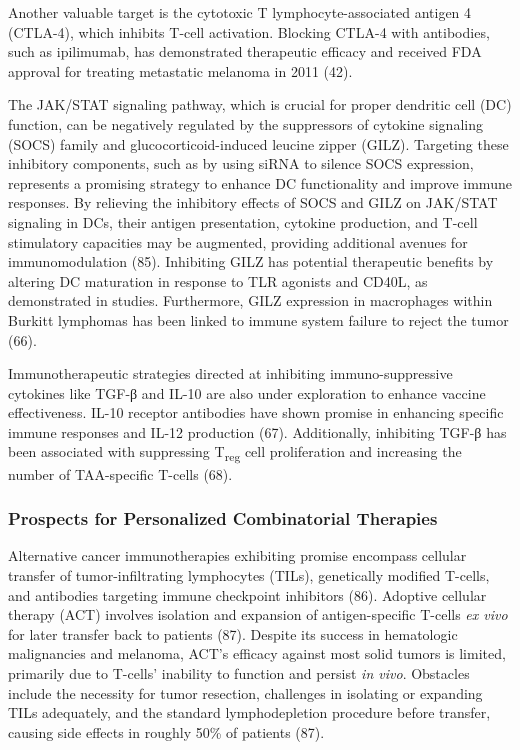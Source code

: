 \documentclass[
]{article}
\begin{document}
Another valuable target is the cytotoxic T lymphocyte-associated antigen
4 (CTLA-4), which inhibits T-cell activation. Blocking CTLA-4 with
antibodies, such as ipilimumab, has demonstrated therapeutic efficacy
and received FDA approval for treating metastatic melanoma in 2011 (42).

The JAK/STAT signaling pathway, which is crucial for proper dendritic
cell (DC) function, can be negatively regulated by the suppressors of
cytokine signaling (SOCS) family and glucocorticoid-induced leucine
zipper (GILZ). Targeting these inhibitory components, such as by using
siRNA to silence SOCS expression, represents a promising strategy to
enhance DC functionality and improve immune responses. By relieving the
inhibitory effects of SOCS and GILZ on JAK/STAT signaling in DCs, their
antigen presentation, cytokine production, and T-cell stimulatory
capacities may be augmented, providing additional avenues for
immunomodulation (85). Inhibiting GILZ has potential therapeutic
benefits by altering DC maturation in response to TLR agonists and
CD40L, as demonstrated in studies. Furthermore, GILZ expression in
macrophages within Burkitt lymphomas has been linked to immune system
failure to reject the tumor (66).

Immunotherapeutic strategies directed at inhibiting immuno-suppressive
cytokines like TGF-β and IL-10 are also under exploration to enhance
vaccine effectiveness. IL-10 receptor antibodies have shown promise in
enhancing specific immune responses and IL-12 production (67).
Additionally, inhibiting TGF-β has been associated with suppressing
T\textsubscript{reg} cell proliferation and increasing the number of
TAA-specific T-cells (68).

\subsubsection{Prospects for Personalized Combinatorial
Therapies}\label{prospects-for-personalized-combinatorial-therapies}

Alternative cancer immunotherapies exhibiting promise encompass cellular
transfer of tumor-infiltrating lymphocytes (TILs), genetically modified
T-cells, and antibodies targeting immune checkpoint inhibitors (86).
Adoptive cellular therapy (ACT) involves isolation and expansion of
antigen-specific T-cells \emph{ex vivo} for later transfer back to
patients (87). Despite its success in hematologic malignancies and
melanoma, ACT's efficacy against most solid tumors is limited, primarily
due to T-cells' inability to function and persist \emph{in vivo}.
Obstacles include the necessity for tumor resection, challenges in
isolating or expanding TILs adequately, and the standard lymphodepletion
procedure before transfer, causing side effects in roughly 50\% of
patients (87).
\end{document}
